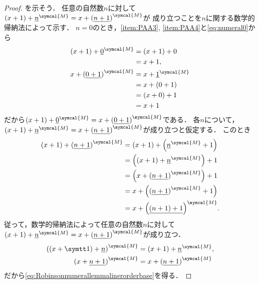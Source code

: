 \begin{proof}
	を示そう．
	任意の自然数\(n\)に対して
	\(\paren{x + 1} + \interpretation{\symcal{M}}{\numeral{n}} = x + \interpretation{\symcal{M}}{\paren{\numeral{n + 1}}}\)が
	成り立つことを\(n\)に関する数学的帰納法によって示す．
	\(n = 0\)のとき，\cref{item:PAA3}, \cref{item:PAA4}と\cref{eq:numeral0}から
	\begin{align*}
		\paren{x + 1} + \interpretation{\symcal{M}}{\numeral{0}}
		 & = \paren{x + 1} + 0                            \\
		 & = x + 1,                                       \\
		x + \interpretation{\symcal{M}}{\paren{\numeral{0 + 1}}}
		 & = x + \interpretation{\symcal{M}}{\numeral{1}} \\
		 & = x + \paren{0 + 1}                            \\
		 & = \paren{x + 0} + 1                            \\
		 & = x + 1
	\end{align*}
	だから\(\paren{x + 1} + \interpretation{\symcal{M}}{{\numeral{0}}} = x + \interpretation{\symcal{M}}{\paren{\numeral{0 + 1}}}\)である．
	各\(n\)について，
	\(\paren{x + 1} + \interpretation{\symcal{M}}{\numeral{n}} = x + \interpretation{\symcal{M}}{\paren{\numeral{n + 1}}}\)が成り立つと仮定する．
	このとき
	\begin{align*}
		\paren{x + 1} + \interpretation{\symcal{M}}{\paren{\numeral{n + 1}}}
		 & = \paren{x + 1} + \paren{\interpretation{\symcal{M}}{\numeral{n}} + 1}  \\
		 & = \paren{\paren{x + 1} + \interpretation{\symcal{M}}{\numeral{n}}} + 1  \\
		 & = \paren{x + \interpretation{\symcal{M}}{\paren{\numeral{n + 1}}}} + 1  \\
		 & = x + \paren{\interpretation{\symcal{M}}{\paren{\numeral{n + 1}}} + 1}  \\
		 & = x + \interpretation{\symcal{M}}{\paren{\numeral{\paren{n + 1} + 1}}}.
	\end{align*}
	従って，数学的帰納法によって任意の自然数\(n\)に対して
	\(\paren{x + 1} + \interpretation{\symcal{M}}{\numeral{n}} = x + \interpretation{\symcal{M}}{\paren{\numeral{n + 1}}}\)が成り立つ．
	\begin{align*}
		\interpretation{\symcal{M}}{\paren{\paren{x + \obj{1}} + \numeral{n}}} & = \paren{x + 1} + \interpretation{\symcal{M}}{\numeral{n}}, \\
		\interpretation{\symcal{M}}{\paren{x + \numeral{n + 1}}}               & = x + \interpretation{\symcal{M}}{\paren{\numeral{n + 1}}}
	\end{align*}
	だから\cref{eq:Robinsonnumerallemmalinerorderbase}を得る．


\end{proof}
